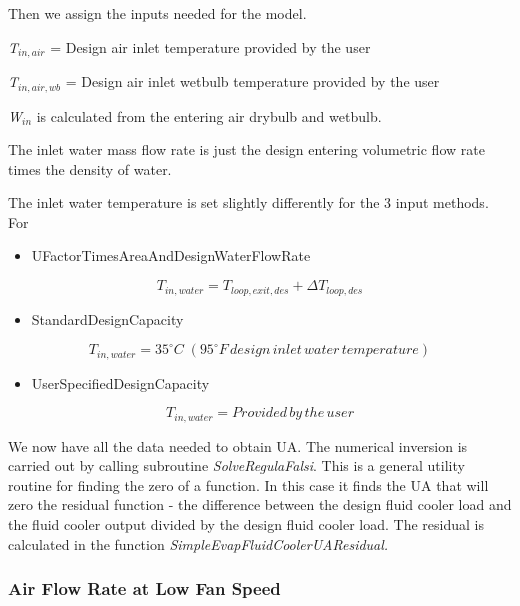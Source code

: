 Then we assign the inputs needed for the model.

\emph{T\(_{in,air}\)} = Design air inlet temperature provided by the user

\emph{T\(_{in,air,wb}\)} = Design air inlet wetbulb temperature provided by the user

\emph{W\(_{in}\)} is calculated from the entering air drybulb and wetbulb.

The inlet water mass flow rate is just the design entering volumetric flow rate times the density of water.

The inlet water temperature is set slightly differently for the 3 input methods. For

\begin{itemize}
\tightlist
\item
  UFactorTimesAreaAndDesignWaterFlowRate
\end{itemize}

\begin{equation}
{T_{in,water}} = {T_{loop,exit,des}} + \Delta {T_{loop,des}}
\end{equation}

\begin{itemize}
\tightlist
\item
  StandardDesignCapacity
\end{itemize}

\begin{equation}
{T_{in,water}} = 35^\circ C\;(95^\circ F\,design\,inlet\,water\,temperature)
\end{equation}

\begin{itemize}
\tightlist
\item
  UserSpecifiedDesignCapacity
\end{itemize}

\begin{equation}
{T_{in,water}} = Provided\,by\,the\,user
\end{equation}

We now have all the data needed to obtain UA. The numerical inversion is carried out by calling subroutine \emph{SolveRegulaFalsi}. This is a general utility routine for finding the zero of a function. In this case it finds the UA that will zero the residual function - the difference between the design fluid cooler load and the fluid cooler output divided by the design fluid cooler load. The residual is calculated in the function \emph{SimpleEvapFluidCoolerUAResidual.}

\subsubsection{Air Flow Rate at Low Fan Speed}\label{air-flow-rate-at-low-fan-speed-2}

